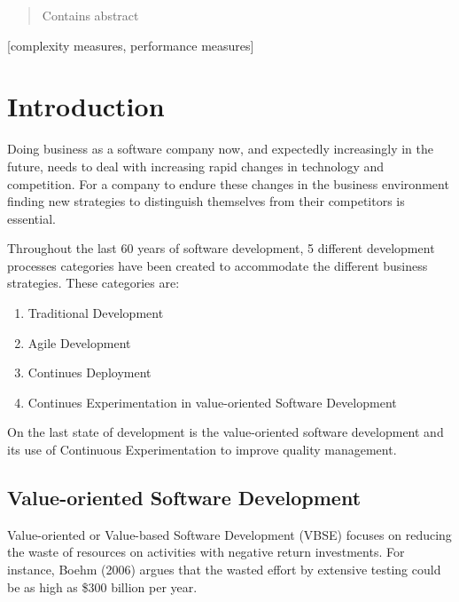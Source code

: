 \documentclass{sig-alternate}
\begin{document}
\maketitle
\begin{abstract}
Contains abstract
\end{abstract}

[complexity measures, performance measures]



\section{Introduction}
Doing business as a software company now, and expectedly increasingly in the future, needs to deal with increasing rapid changes in technology and competition. For a company to endure these changes in the business environment finding new strategies to distinguish themselves from their competitors is essential.\cite{stefan:valuebased}       

Throughout the last 60 years of software development, 5 different development processes categories have been created to accommodate the different business strategies. 
These categories are:
\begin{enumerate}
\item Traditional Development
\item Agile Development
\item Continues Deployment 
\item Continues Experimentation in value-oriented Software Development
\end{enumerate}


On the last state of development is the value-oriented software development and its use of Continuous Experimentation to improve quality management.

\subsection{Value-oriented Software Development}
Value-oriented or Value-based Software Development (VBSE) focuses on reducing the waste of resources on activities with negative return investments. For instance, Boehm (2006) argues that the wasted effort by extensive testing could be as high as \$300 billion per year\cite{stefan:valuebased}.
\end{document}
